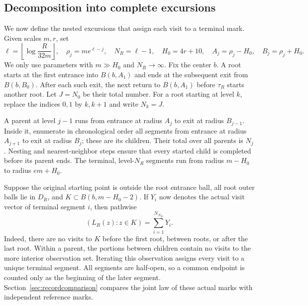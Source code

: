\documentclass[11pt,letterpaper,reqno]{amsart}
\numberwithin{equation}{section}
\theoremstyle{remark}
\begin{document}
\subsection{Decomposition into complete excursions}\label{sec:physical}
We now define the nested excursions that assign each visit to a terminal mark. Given scales $m,r$, set
\begin{equation}\label{eq:2.20}
\ell=\left\lfloor\log\frac R{32m}\right\rfloor,\quad
\rho_j=me^{\ell-j},\quad N_R=\ell-1,\quad
H_0=4r+10,\quad A_j=\rho_j-H_0,\quad B_j=\rho_j+H_0.
\end{equation}
We only use parameters with $m\gg H_0$ and $N_R\to\infty$. Fix the center $b$.
A root starts at the first entrance into $B(b,A_1)$ and ends at the subsequent exit from $B(b,B_0)$. After each such exit, the next return to $B(b,A_1)$ before $\tau_R$ starts another root. Let $J=N_0$ be their total number. For a root starting at level $k$, replace the indices $0,1$ by $k,k+1$ and write $N_k=J$.

A parent at level $j-1$ runs from entrance at radius $A_j$ to exit at radius $B_{j-1}$. Inside it, enumerate in chronological order all segments from entrance at radius $A_{j+1}$ to exit at radius $B_j$; these are its children. Their total over all parents is $N_j$. Nesting and nearest-neighbor steps ensure that every started child is completed before its parent ends. The terminal, level-$N_R$ segments run from radius $m-H_0$ to radius $em+H_0$.

Suppose the original starting point is outside the root entrance ball, all root outer balls lie in $D_R$, and $K\subset B(b,m-H_0-2)$. If $Y_i$ now denotes the actual visit vector of terminal segment $i$, then pathwise
\begin{equation}\label{eq:2.21}
(L_R(z):z\in K)=\sum_{i=1}^{N_{N_R}}Y_i.
\end{equation}
Indeed, there are no visits to $K$ before the first root, between roots, or after the last root. Within a parent, the portions between children contain no visits to the more interior observation set. Iterating this observation assigns every visit to a unique terminal segment. All segments are half-open, so a common endpoint is counted only as the beginning of the later segment. Section~\ref{sec:recordcomparison} compares the joint law of these actual marks with independent reference marks.
\end{document}
